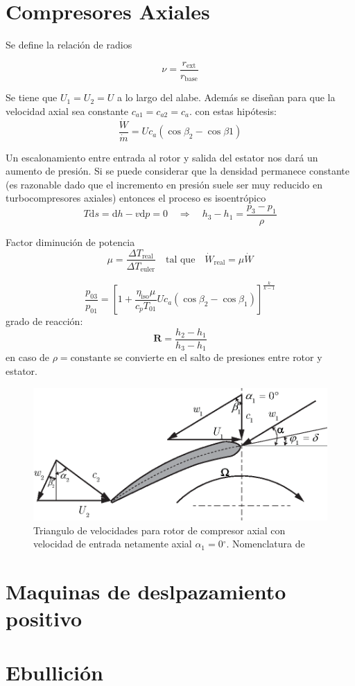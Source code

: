 \documentclass{article}
\newcommand{\substy}[2]{\ensuremath{{#1_{\mathrm{#2}}}}}
\newcommand{\degree}{\ensuremath{{^\circ}}}
\newcommand{\cp}{c_p}
\newcommand{\gasconst}{k}
\newcommand{\ctegas}{\gasconst}
\newcommand{\cax}[1]{\ensuremath{c_{a #1}}}
\newcommand{\di}{\textrm{d}}
\newcommand{\cte}{\textrm{constante}}
\newcommand{\etaiso}{\eta_{\mathrm{iso}}}
\newcommand{\dW}{\dot{W}}
\newcommand{\dm}{\dot{m}}
\newcommand{\radrel}{\nu}
\newcommand{\rext}{\substy{r}{ext}}
\newcommand{\rbase}{\substy{r}{base}}
\newcommand{\powerreduction}{\mu}
\newcommand{\degreeofreaction}{{\bm{R}}}
\begin{document}
\section{Compresores Axiales}
Se define la relación de radios

\[
\radrel = \frac{\rext}{\rbase}
\]

Se tiene que $U_1=U_2=U$ a lo largo del alabe. Además se diseñan para que la velocidad axial sea constante $\cax{1}=\cax{2}=\cax{}$. con estas hipótesis:
\[
\frac{\dW}{\dm}=U \cax{} (\cos \beta_2 - \cos \beta 1 )
\]

Un escalonamiento entre entrada al rotor y salida del estator nos dará un aumento de presión. Si se puede considerar que la densidad permanece constante (es razonable dado que el incremento en presión suele ser muy reducido en turbocompresores axiales) entonces el proceso es isoentrópico
\[
T\di s = \di h - v \di p =0\quad \Rightarrow \quad h_3 - h_1 = \frac{p_3-p_1}{\rho}
\]

Factor diminución de potencia
\[
\powerreduction = \frac{\Delta \substy{T}{real}}{\Delta \substy{T}{euler}} \quad \text{tal que} \quad \substy{\dW}{real} = \powerreduction \dW
\]

\[
\frac{p_{03}}{p_{01}} = \left[1 + \frac{\etaiso \powerreduction}{\cp T_{01}}U \cax{} (\cos \beta_2 - \cos \beta_1) \right]^{\frac{\ctegas}{\ctegas-1}}
\]
grado de reacción:
\[
\degreeofreaction = \frac{h_2 - h_1}{h_3 - h_1}
\]
en caso de $\rho = \cte$ se convierte en el salto de presiones entre rotor y estator.
\begin{figure}[htb!]
    \centering
    \includegraphics{fig/pumpVelTriangle.eps}
    \caption{Triangulo de velocidades para rotor de compresor axial con velocidad de entrada netamente axial $\alpha_1 = 0\degree$. Nomenclatura de \cite{book:TurboDick} }
    \label{fig:velocitytrianglepump}
\end{figure}

\section{Maquinas de deslpazamiento positivo}





\section{Ebullición}








\end{document}
